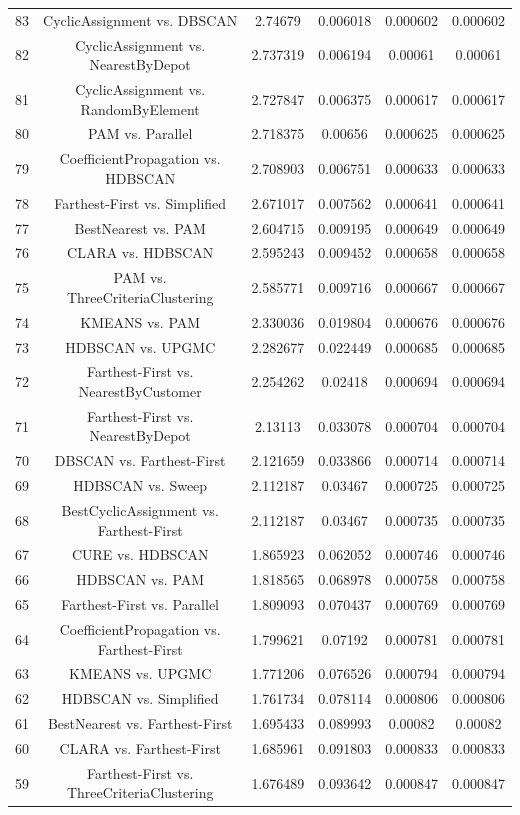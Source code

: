 \documentclass[a4paper,10pt]{article}
\begin{document}
\begin{landscape}
\begin{table}[!htp]
\begin{tabular}{cccccc}
83&CyclicAssignment vs. DBSCAN&2.74679&0.006018&0.000602&0.000602\\
82&CyclicAssignment vs. NearestByDepot&2.737319&0.006194&0.00061&0.00061\\
81&CyclicAssignment vs. RandomByElement&2.727847&0.006375&0.000617&0.000617\\
80&PAM vs. Parallel&2.718375&0.00656&0.000625&0.000625\\
79&CoefficientPropagation vs. HDBSCAN&2.708903&0.006751&0.000633&0.000633\\
78&Farthest-First vs. Simplified&2.671017&0.007562&0.000641&0.000641\\
77&BestNearest vs. PAM&2.604715&0.009195&0.000649&0.000649\\
76&CLARA vs. HDBSCAN&2.595243&0.009452&0.000658&0.000658\\
75&PAM vs. ThreeCriteriaClustering&2.585771&0.009716&0.000667&0.000667\\
74&KMEANS vs. PAM&2.330036&0.019804&0.000676&0.000676\\
73&HDBSCAN vs. UPGMC&2.282677&0.022449&0.000685&0.000685\\
72&Farthest-First vs. NearestByCustomer&2.254262&0.02418&0.000694&0.000694\\
71&Farthest-First vs. NearestByDepot&2.13113&0.033078&0.000704&0.000704\\
70&DBSCAN vs. Farthest-First&2.121659&0.033866&0.000714&0.000714\\
69&HDBSCAN vs. Sweep&2.112187&0.03467&0.000725&0.000725\\
68&BestCyclicAssignment vs. Farthest-First&2.112187&0.03467&0.000735&0.000735\\
67&CURE vs. HDBSCAN&1.865923&0.062052&0.000746&0.000746\\
66&HDBSCAN vs. PAM&1.818565&0.068978&0.000758&0.000758\\
65&Farthest-First vs. Parallel&1.809093&0.070437&0.000769&0.000769\\
64&CoefficientPropagation vs. Farthest-First&1.799621&0.07192&0.000781&0.000781\\
63&KMEANS vs. UPGMC&1.771206&0.076526&0.000794&0.000794\\
62&HDBSCAN vs. Simplified&1.761734&0.078114&0.000806&0.000806\\
61&BestNearest vs. Farthest-First&1.695433&0.089993&0.00082&0.00082\\
60&CLARA vs. Farthest-First&1.685961&0.091803&0.000833&0.000833\\
59&Farthest-First vs. ThreeCriteriaClustering&1.676489&0.093642&0.000847&0.000847\\

\end{tabular}
\end{table}
\end{landscape}
\end{document}
